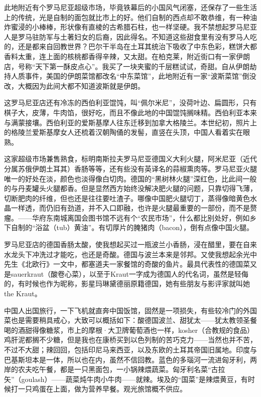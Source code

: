 \par 此地附近有个罗马尼亚超级市场，毕竟铁幕后的小国风气闭塞，还保存了一些生活上的传统，光是自制的面包就比市上的好。他们自制的西点却不敢恭维，有一种油炸蜜浸的小棒棒，形状像有直棱的古希腊石柱，也一样坚硬。我不禁想起罗马尼亚人是罗马驻防军与土著妇女的后裔，因此得名。不知道这些甜食里有没有罗马人吃的，还是都来自回教世界？巴尔干半岛在土耳其统治下吸收了中东色彩，糕饼大都香料太重，连上面的核桃都香得辛辣，又太甜。在柏克莱，附近街口有一家伊朗店，号称“天下第一酥皮点心”。我买了一块夹蜜的千层糕试试，奇甜。自从伊朗劫持人质事件，美国的伊朗菜馆都改名“中东菜馆”，此地附近有一家“波斯菜馆”倒没改，大概因为此间大都不知道波斯就是伊朗。
\par 这罗马尼亚店还有冷冻的西伯利亚馄饨，叫“佩尔米尼”，没荷叶边、扁圆形，只有棋子大，皮薄，牛肉馅，很好吃，而且不像此地的中国馄饨搁味精。西伯利亚本来与满蒙接壤。西伯利亚的爱斯基摩人往东迁移到加拿大格陵兰。本世纪初，照片上的格陵兰爱斯基摩女人还梳着汉朝陶俑的发髻，直竖在头顶，中国人看着实在眼熟。
\par 这家超级市场兼售熟食，标明南斯拉夫罗马尼亚德国义大利火腿，阿米尼亚（近代分属苏俄伊朗土耳其）香肠等等，还有些没有英译名的蒜椒熏肉等。罗马尼亚火腿唯一的好处在淡，颜色也淡得像白切肉。德国的“黑树林火腿”深红色，比此间一般的与丹麦罐头火腿都香。但是显然西方始终没解决肥火腿的问题，只靠切得飞薄，切断肥肉的纤维，但也还是往往要吐渣子。哪像中国肥火腿切丁，蒸得像暗黄色水晶一样透，而仍旧有劲道，并不入口即融，也许是火腿最重要的一部份，而不是赘瘤。——华府东南城离国会图书馆不远有个“农民市场”，什么都比别处好，例如乡下自制的“浴盆（tub）黄油”。有切厚片的腌猪肉（bacon），倒有点像中国火腿。
\par 罗马尼亚店的德国香肠太酸，使我想起买过一瓶波兰小香肠，浸在醋里，要在自来水龙头下冲洗过才能吃，也还是奇酸。德国与波兰本来是邻邦。又使我想起余光中先生《北欧行》一文中，都塞道夫一家餐馆的奇酸的鱼片。最具代表性的德国菜又是sauerkraut（酸卷心菜），以至于Kraut一字成为德国人的代名词，虽然是轻侮的，有时候也作为昵称，影星玛琳黛德丽原籍德国，她有些朋友与影评家就叫她the Kraut。
\par 中国人出国旅行，一下飞机就直奔中国饭馆，固然是一项损失，有些较冷门的外国菜也是需要稍具戒心，大致可以概括如下：酸德国波兰、甜犹太——犹太教领圣餐喝的酒甜得像糖浆，市上的摩根·大卫牌葡萄酒也一样，kosher（合教规的食品）鸡肝泥都搁不少糖，但是我也在康桥买到以色列制的苦巧克力——当然也并不苦，不过不大甜；辣回回，包括印尼马来西亚，以及东欧的土耳其帝国旧属地。印度与巴基斯坦本是一体，所以也在内，虽然不信回教。蓝色的多瑙河一流进匈牙利，两岸的农夫吃午餐，都是一只黑面包，一小锅辣煨蔬菜。匈牙利名菜“古拉矢”（goulash）——蔬菜炖牛肉小牛肉——就辣。埃及的“国菜”是辣煨黄豆，有时候打一只鸡蛋在上面，做为营养早餐。观光旅馆概不供应。
